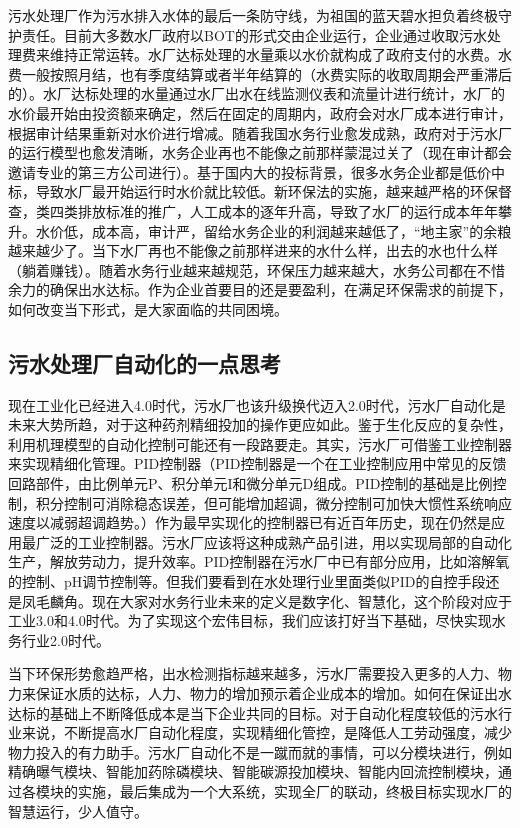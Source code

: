 \documentclass[]{book}
\begin{document}
污水处理厂作为污水排入水体的最后一条防守线，为祖国的蓝天碧水担负着终极守护责任。目前大多数水厂政府以BOT的形式交由企业运行，企业通过收取污水处理费来维持正常运转。水厂达标处理的水量乘以水价就构成了政府支付的水费。水费一般按照月结，也有季度结算或者半年结算的（水费实际的收取周期会严重滞后的）。水厂达标处理的水量通过水厂出水在线监测仪表和流量计进行统计，水厂的水价最开始由投资额来确定，然后在固定的周期内，政府会对水厂成本进行审计，根据审计结果重新对水价进行增减。随着我国水务行业愈发成熟，政府对于污水厂的运行模型也愈发清晰，水务企业再也不能像之前那样蒙混过关了（现在审计都会邀请专业的第三方公司进行）。基于国内大的投标背景，很多水务企业都是低价中标，导致水厂最开始运行时水价就比较低。新环保法的实施，越来越严格的环保督查，类四类排放标准的推广，人工成本的逐年升高，导致了水厂的运行成本年年攀升。水价低，成本高，审计严，留给水务企业的利润越来越低了，``地主家''的余粮越来越少了。当下水厂再也不能像之前那样进来的水什么样，出去的水也什么样（躺着赚钱）。随着水务行业越来越规范，环保压力越来越大，水务公司都在不惜余力的确保出水达标。作为企业首要目的还是要盈利，在满足环保需求的前提下，如何改变当下形式，是大家面临的共同困境。

\hypertarget{ux6c61ux6c34ux5904ux7406ux5382ux81eaux52a8ux5316ux7684ux4e00ux70b9ux601dux8003}{%
\subsection{污水处理厂自动化的一点思考}\label{ux6c61ux6c34ux5904ux7406ux5382ux81eaux52a8ux5316ux7684ux4e00ux70b9ux601dux8003}}

现在工业化已经进入4.0时代，污水厂也该升级换代迈入2.0时代，污水厂自动化是未来大势所趋，对于这种药剂精细投加的操作更应如此。鉴于生化反应的复杂性，利用机理模型的自动化控制可能还有一段路要走。其实，污水厂可借鉴工业控制器来实现精细化管理。PID控制器（PID控制器是一个在工业控制应用中常见的反馈回路部件，由比例单元P、积分单元I和微分单元D组成。PID控制的基础是比例控制，积分控制可消除稳态误差，但可能增加超调，微分控制可加快大惯性系统响应速度以减弱超调趋势。）作为最早实现化的控制器已有近百年历史，现在仍然是应用最广泛的工业控制器。污水厂应该将这种成熟产品引进，用以实现局部的自动化生产，解放劳动力，提升效率。PID控制器在污水厂中已有部分应用，比如溶解氧的控制、pH调节控制等。但我们要看到在水处理行业里面类似PID的自控手段还是凤毛麟角。现在大家对水务行业未来的定义是数字化、智慧化，这个阶段对应于工业3.0和4.0时代。为了实现这个宏伟目标，我们应该打好当下基础，尽快实现水务行业2.0时代。

当下环保形势愈趋严格，出水检测指标越来越多，污水厂需要投入更多的人力、物力来保证水质的达标，人力、物力的增加预示着企业成本的增加。如何在保证出水达标的基础上不断降低成本是当下企业共同的目标。对于自动化程度较低的污水行业来说，不断提高水厂自动化程度，实现精细化管控，是降低人工劳动强度，减少物力投入的有力助手。污水厂自动化不是一蹴而就的事情，可以分模块进行，例如精确曝气模块、智能加药除磷模块、智能碳源投加模块、智能内回流控制模块，通过各模块的实施，最后集成为一个大系统，实现全厂的联动，终极目标实现水厂的智慧运行，少人值守。
\end{document}

